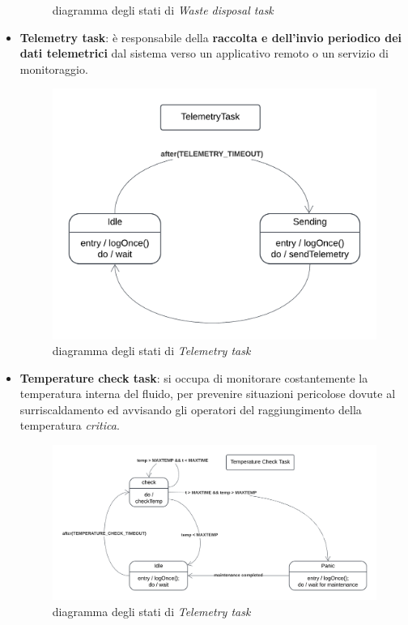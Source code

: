 \documentclass{report}
\begin{document}
\begin{itemize}
{\begin{figure}[H]
        \caption{diagramma degli stati di \textit{Waste disposal task}}
        \label{fig:waste-task}
    \end{figure}
    }
    \item {
    \textbf{Telemetry task}: è responsabile della \textbf{raccolta e dell'invio periodico dei dati telemetrici} dal sistema verso un applicativo remoto o un servizio di monitoraggio.
    \begin{figure}[H]
        \centering
        \includegraphics[width=0.6\linewidth]{img/assignment-02/Diagrammi per IOT - Telemetry Task.png}
        \caption{diagramma degli stati di \textit{Telemetry task}}
        \label{fig:telemetry-task}
    \end{figure}
    }
    \item {
    \textbf{Temperature check task}: si occupa di monitorare costantemente la temperatura interna del fluido, per prevenire situazioni pericolose dovute al surriscaldamento ed avvisando gli operatori del raggiungimento della temperatura \textit{critica}.
    \begin{figure}[H]
        \centering
        \includegraphics[width=0.9\linewidth]{img/assignment-02/Diagrammi per IOT - Temperature Check Task.png}
        \caption{diagramma degli stati di \textit{Telemetry task}}
        \label{fig:temperature-task}
    \end{figure}
    }
\end{itemize}
\end{document}
